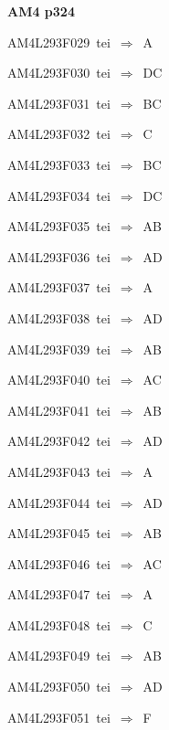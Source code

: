 \par\vfill\eject
{\bf\hfill AM4 p324\hfill\hbox{}}\par\bigskip
{\sixrm AM4L293F029\ {\sixit tei}\ }$\Rightarrow$\ A\par\smallskip
{\sixrm AM4L293F030\ {\sixit tei}\ }$\Rightarrow$\ DC\par\smallskip
{\sixrm AM4L293F031\ {\sixit tei}\ }$\Rightarrow$\ BC\par\smallskip
{\sixrm AM4L293F032\ {\sixit tei}\ }$\Rightarrow$\ C\par\smallskip
{\sixrm AM4L293F033\ {\sixit tei}\ }$\Rightarrow$\ BC\par\smallskip
{\sixrm AM4L293F034\ {\sixit tei}\ }$\Rightarrow$\ DC\par\smallskip
{\sixrm AM4L293F035\ {\sixit tei}\ }$\Rightarrow$\ AB\par\smallskip
{\sixrm AM4L293F036\ {\sixit tei}\ }$\Rightarrow$\ AD\par\smallskip
{\sixrm AM4L293F037\ {\sixit tei}\ }$\Rightarrow$\ A\par\smallskip
{\sixrm AM4L293F038\ {\sixit tei}\ }$\Rightarrow$\ AD\par\smallskip
{\sixrm AM4L293F039\ {\sixit tei}\ }$\Rightarrow$\ AB\par\smallskip
{\sixrm AM4L293F040\ {\sixit tei}\ }$\Rightarrow$\ AC\par\smallskip
{\sixrm AM4L293F041\ {\sixit tei}\ }$\Rightarrow$\ AB\par\smallskip
{\sixrm AM4L293F042\ {\sixit tei}\ }$\Rightarrow$\ AD\par\smallskip
{\sixrm AM4L293F043\ {\sixit tei}\ }$\Rightarrow$\ A\par\smallskip
{\sixrm AM4L293F044\ {\sixit tei}\ }$\Rightarrow$\ AD\par\smallskip
{\sixrm AM4L293F045\ {\sixit tei}\ }$\Rightarrow$\ AB\par\smallskip
{\sixrm AM4L293F046\ {\sixit tei}\ }$\Rightarrow$\ AC\par\smallskip
{\sixrm AM4L293F047\ {\sixit tei}\ }$\Rightarrow$\ A\par\smallskip
{\sixrm AM4L293F048\ {\sixit tei}\ }$\Rightarrow$\ C\par\smallskip
{\sixrm AM4L293F049\ {\sixit tei}\ }$\Rightarrow$\ AB\par\smallskip
{\sixrm AM4L293F050\ {\sixit tei}\ }$\Rightarrow$\ AD\par\smallskip
{\sixrm AM4L293F051\ {\sixit tei}\ }$\Rightarrow$\ F\par\smallskip
